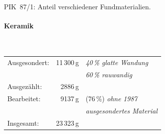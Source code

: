 \begin{table}[tb]
	\centering
	{\footnotesize }
	\caption{PIK~87/1: Anteil verschiedener Fundmaterialien.}
	\label{tab:PIK87-1_Funde}
\end{table}

\paragraph{Keramik\vspace{.5em}}\mbox{}\\
\begin{tabular}{@{}lrl@{}}
	Ausgesondert: & 11\,300\,g & \textit{40\,\% glatte Wandung} \\
	& & \textit{60\,\% rauwandig} \\
	Ausgezählt: & 2886\,g & \\
	Bearbeitet: & 9137\,g & (76\,\%) \textit{ohne 1987} \\
	& & \textit{ausgesondertes Material} \\
	Insgesamt: & 23\,323\,g &
\end{tabular}


